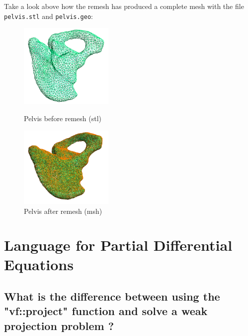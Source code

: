 \begin{itemize}
 Take a look above how the remesh has produced a complete mesh with the file \lstinline!pelvis.stl! and \lstinline!pelvis.geo!:

\begin{figure}[!h]
\begin{minipage}[b]{.50\linewidth}
\centering
\includegraphics[width=4.5cm]{pngs/mymesh/pelvis_stl.png}
\caption{Pelvis before remesh (stl)}
\end{minipage}
\begin{minipage}[b]{.50\linewidth}
\centering
\includegraphics[width=4.5cm]{pngs/mymesh/pelvis_msh.png}
\caption{Pelvis after remesh (msh)}
\end{minipage}
\end{figure}

\end{itemize}


\section{Language for Partial Differential Equations}
\label{faq:PDE}

\subsection{What is the difference between using the "vf::project" function and solve a weak projection problem ?}

